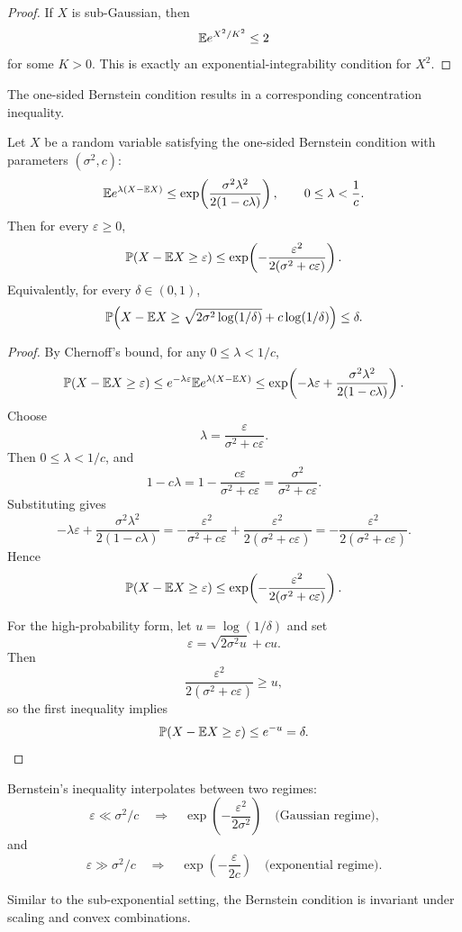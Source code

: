 \begin{proof}
If $X$ is sub-Gaussian, then
\[
\mathbb{E} e^{X^2/K^2}\le 2
\]
for some $K>0$. This is exactly an exponential-integrability condition for $X^2$.
\end{proof}

The one-sided Bernstein condition results in a corresponding concentration inequality.
\begin{thm}
Let $X$ be a random variable satisfying the one-sided Bernstein condition with parameters $(\sigma^2,c)$:
\[
\mathbb{E} e^{\lambda(X-\mathbb{E} X)}
\le
\exp\!\left(\frac{\sigma^2\lambda^2}{2(1-c\lambda)}\right),
\qquad 0\le \lambda<\frac1c.
\]
Then for every $\varepsilon\ge 0$,
\[
\mathbb{P}(X-\mathbb{E} X\ge \varepsilon)
\le
\exp\!\left(-\frac{\varepsilon^2}{2(\sigma^2+c\varepsilon)}\right).
\]
Equivalently, for every $\delta\in(0,1)$,
\[
\mathbb{P}\!\left(
X-\mathbb{E} X
\ge
\sqrt{2\sigma^2\log(1/\delta)}+c\log(1/\delta)
\right)
\le \delta.
\]
\end{thm}

\begin{proof}
By Chernoff's bound, for any $0\le \lambda<1/c$,
\[
\mathbb{P}(X-\mathbb{E} X\ge \varepsilon)
\le
e^{-\lambda\varepsilon}\mathbb{E} e^{\lambda(X-\mathbb{E} X)}
\le
\exp\!\left(
-\lambda\varepsilon+\frac{\sigma^2\lambda^2}{2(1-c\lambda)}
\right).
\]
Choose
\[
\lambda=\frac{\varepsilon}{\sigma^2+c\varepsilon}.
\]
Then $0\le \lambda<1/c$, and
\[
1-c\lambda = 1-\frac{c\varepsilon}{\sigma^2+c\varepsilon}
= \frac{\sigma^2}{\sigma^2+c\varepsilon}.
\]
Substituting gives
\[
-\lambda\varepsilon+\frac{\sigma^2\lambda^2}{2(1-c\lambda)}
=
-\frac{\varepsilon^2}{\sigma^2+c\varepsilon}
+\frac{\varepsilon^2}{2(\sigma^2+c\varepsilon)}
=
-\frac{\varepsilon^2}{2(\sigma^2+c\varepsilon)}.
\]
Hence
\[
\mathbb{P}(X-\mathbb{E} X\ge \varepsilon)
\le
\exp\!\left(-\frac{\varepsilon^2}{2(\sigma^2+c\varepsilon)}\right).
\]

For the high-probability form, let $u=\log(1/\delta)$ and set
\[
\varepsilon=\sqrt{2\sigma^2u}+cu.
\]
Then
\[
\frac{\varepsilon^2}{2(\sigma^2+c\varepsilon)}\ge u,
\]
so the first inequality implies
\[
\mathbb{P}(X-\mathbb{E} X\ge \varepsilon)\le e^{-u}=\delta.
\]
\end{proof}

\begin{remark}
Bernstein's inequality interpolates between two regimes:
\[
\varepsilon \ll \sigma^2/c
\quad \Rightarrow \quad
\exp\!\left(-\frac{\varepsilon^2}{2\sigma^2}\right)
\quad \text{(Gaussian regime),}
\]
and
\[
\varepsilon \gg \sigma^2/c
\quad \Rightarrow \quad
\exp\!\left(-\frac{\varepsilon}{2c}\right)
\quad \text{(exponential regime).}
\]
\end{remark}
Similar to the sub-exponential setting, the Bernstein condition is invariant under scaling and convex combinations.

